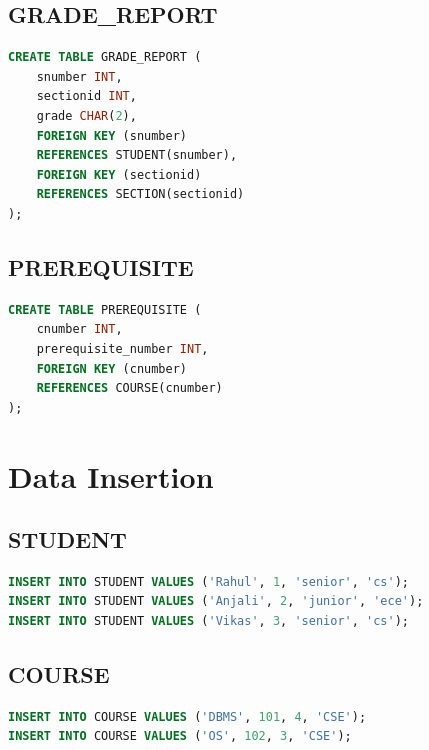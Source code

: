 \documentclass[12pt,a4paper]{report}
\begin{document}
\subsection*{GRADE\_REPORT}
\begin{lstlisting}[language=SQL]
CREATE TABLE GRADE_REPORT (
    snumber INT,
    sectionid INT,
    grade CHAR(2),
    FOREIGN KEY (snumber)
    REFERENCES STUDENT(snumber),
    FOREIGN KEY (sectionid)
    REFERENCES SECTION(sectionid)
);
\end{lstlisting}

\newpage

\vspace{-1.0cm}

\subsection*{PREREQUISITE}
\begin{lstlisting}[language=SQL]
CREATE TABLE PREREQUISITE (
    cnumber INT,
    prerequisite_number INT,
    FOREIGN KEY (cnumber)
    REFERENCES COURSE(cnumber)
);
\end{lstlisting}



\section*{Data Insertion}

\subsection*{STUDENT}
\begin{lstlisting}[language=SQL]
INSERT INTO STUDENT VALUES ('Rahul', 1, 'senior', 'cs');
INSERT INTO STUDENT VALUES ('Anjali', 2, 'junior', 'ece');
INSERT INTO STUDENT VALUES ('Vikas', 3, 'senior', 'cs');
\end{lstlisting}

\subsection*{COURSE}
\begin{lstlisting}[language=SQL]
INSERT INTO COURSE VALUES ('DBMS', 101, 4, 'CSE');
INSERT INTO COURSE VALUES ('OS', 102, 3, 'CSE');
\end{lstlisting}
\end{document}
